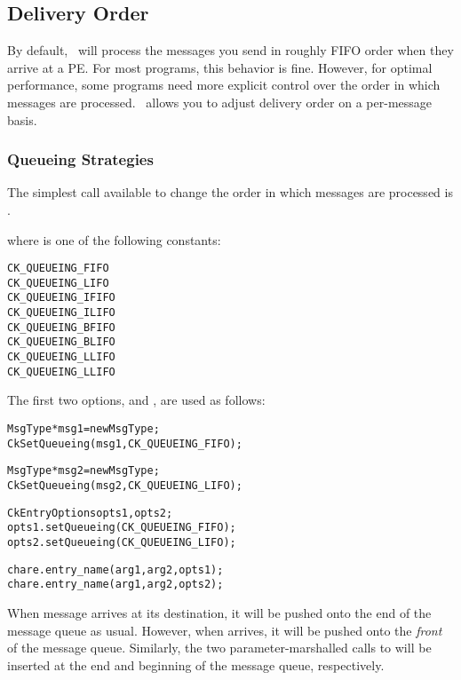 \subsection{Delivery Order}

By default, \charmpp\ will process the messages you send in roughly
FIFO order when they arrive at a PE.
For most programs, this behavior is fine.  However, for optimal
performance, some programs need more explicit control over the order
in which messages are processed. \charmpp\ allows you to adjust
delivery order on a per-message basis.


\subsubsection{Queueing Strategies}
\label{queueing strategies}

The simplest call available to change the order in which messages
are processed is .


where  is one of the following constants:

\begin{alltt}
  CK_QUEUEING_FIFO
  CK_QUEUEING_LIFO
  CK_QUEUEING_IFIFO
  CK_QUEUEING_ILIFO
  CK_QUEUEING_BFIFO
  CK_QUEUEING_BLIFO
  CK_QUEUEING_LLIFO
  CK_QUEUEING_LLIFO
\end{alltt}

The first two options,   and
, are used as follows:

\begin{alltt}
  MsgType *msg1 = new MsgType ;
  CkSetQueueing(msg1, CK_QUEUEING_FIFO);

  MsgType *msg2 = new MsgType ;
  CkSetQueueing(msg2, CK_QUEUEING_LIFO);

  CkEntryOptions opts1, opts2;
  opts1.setQueueing(CK_QUEUEING_FIFO);
  opts2.setQueueing(CK_QUEUEING_LIFO);

  chare.entry_name(arg1, arg2, opts1);
  chare.entry_name(arg1, arg2, opts2);
\end{alltt}

When message  arrives at its destination, it will be pushed
onto the end of the message queue as usual.  However, when 
arrives, it will be pushed onto the {\em front} of the message
queue. Similarly, the two parameter-marshalled calls to 
will be inserted at the end and beginning of the message queue,
respectively.

